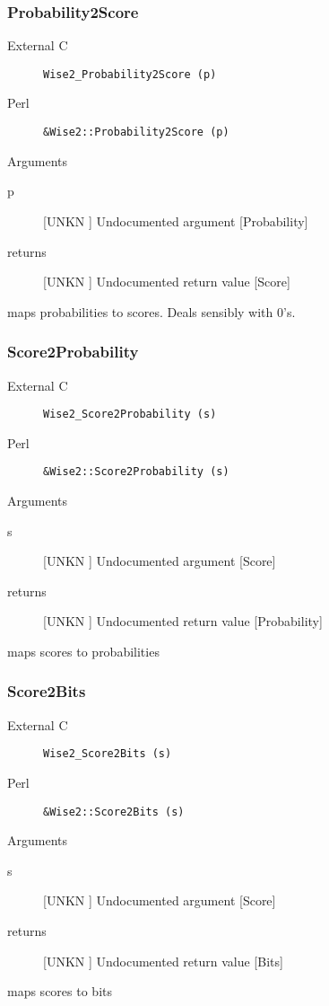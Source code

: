 \subsubsection{Probability2Score}
\begin{description}
\item[External C] {\tt Wise2_Probability2Score (p)}
\item[Perl] {\tt &Wise2::Probability2Score (p)}

\end{description}
Arguments
\begin{description}
\item[p] [UNKN ] Undocumented argument [Probability]
\item[returns] [UNKN ] Undocumented return value [Score]
\end{description}
maps probabilities to scores. Deals
sensibly with 0's.


\subsubsection{Score2Probability}
\begin{description}
\item[External C] {\tt Wise2_Score2Probability (s)}
\item[Perl] {\tt &Wise2::Score2Probability (s)}

\end{description}
Arguments
\begin{description}
\item[s] [UNKN ] Undocumented argument [Score]
\item[returns] [UNKN ] Undocumented return value [Probability]
\end{description}
maps scores to probabilities


\subsubsection{Score2Bits}
\begin{description}
\item[External C] {\tt Wise2_Score2Bits (s)}
\item[Perl] {\tt &Wise2::Score2Bits (s)}

\end{description}
Arguments
\begin{description}
\item[s] [UNKN ] Undocumented argument [Score]
\item[returns] [UNKN ] Undocumented return value [Bits]
\end{description}
maps scores to bits



